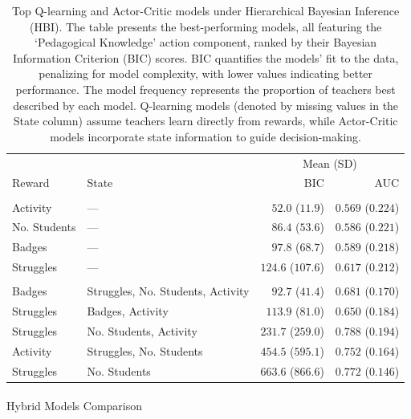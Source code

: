 \documentclass[
  number,
  preprint,
  3p,
  onecolumn]{elsarticle}
\makeatletter
\let\oldparagraph\paragraph
\renewcommand{\paragraph}{
    \@ifstar
      \xxxParagraphStar
      \xxxParagraphNoStar
  }
\newcommand{\xxxParagraphStar}[1]{\oldparagraph*{#1}\mbox{}}
\newcommand{\xxxParagraphNoStar}[1]{\oldparagraph{#1}\mbox{}}
\makeatother
\begin{document}
\begin{longtable}{llrr}

\caption{\label{tbl-CBM-HBI}Top Q-learning and Actor-Critic models under
Hierarchical Bayesian Inference (HBI). The table presents the
best-performing models, all featuring the `Pedagogical Knowledge' action
component, ranked by their Bayesian Information Criterion (BIC) scores.
BIC quantifies the models' fit to the data, penalizing for model
complexity, with lower values indicating better performance. The model
frequency represents the proportion of teachers best described by each
model. Q-learning models (denoted by missing values in the State column)
assume teachers learn directly from rewards, while Actor-Critic models
incorporate state information to guide decision-making.}

\tabularnewline

\toprule
 &  & \multicolumn{2}{c}{Mean (SD)} \\ 
\cmidrule(lr){3-4}
Reward & State & BIC & AUC \\ 
\midrule\addlinespace[2.5pt]
\multicolumn{4}{l}{Q-learning} \\ 
\midrule\addlinespace[2.5pt]
Activity & — & $52.0$ ($11.9$) & $0.569$ ($0.224$) \\ 
No. Students & — & $86.4$ ($53.6$) & $0.586$ ($0.221$) \\ 
Badges & — & $97.8$ ($68.7$) & $0.589$ ($0.218$) \\ 
Struggles & — & $124.6$ ($107.6$) & $0.617$ ($0.212$) \\ 
\midrule\addlinespace[2.5pt]
\multicolumn{4}{l}{Actor-Critic} \\ 
\midrule\addlinespace[2.5pt]
Badges & Struggles, No. Students, Activity & $92.7$ ($41.4$) & $0.681$ ($0.170$) \\ 
Struggles & Badges, Activity & $113.9$ ($81.0$) & $0.650$ ($0.184$) \\ 
Struggles & No. Students, Activity & $231.7$ ($259.0$) & $0.788$ ($0.194$) \\ 
Activity & Struggles, No. Students & $454.5$ ($595.1$) & $0.752$ ($0.164$) \\ 
Struggles & No. Students & $663.6$ ($866.6$) & $0.772$ ($0.146$) \\ 
\bottomrule

\end{longtable}

\paragraph{Hybrid Models Comparison}\label{hybrid-models-comparison}
\end{document}
